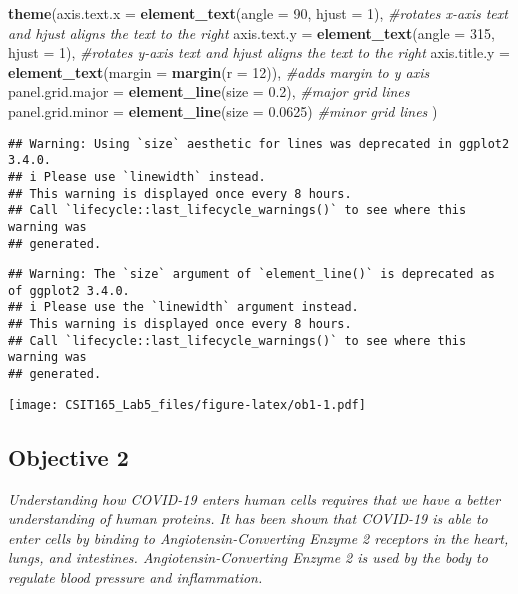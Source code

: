 \documentclass[
]{article}
\newenvironment{Shaded}{\begin{snugshade}}{\end{snugshade}}
\newcommand{\AttributeTok}[1]{\textcolor[rgb]{0.13,0.29,0.53}{#1}}
\newcommand{\CommentTok}[1]{\textcolor[rgb]{0.56,0.35,0.01}{\textit{#1}}}
\newcommand{\DecValTok}[1]{\textcolor[rgb]{0.00,0.00,0.81}{#1}}
\newcommand{\FloatTok}[1]{\textcolor[rgb]{0.00,0.00,0.81}{#1}}
\newcommand{\FunctionTok}[1]{\textcolor[rgb]{0.13,0.29,0.53}{\textbf{#1}}}
\newcommand{\NormalTok}[1]{#1}
\begin{document}
\begin{Shaded}
\begin{Highlighting}[]
  \FunctionTok{theme}\NormalTok{(}\AttributeTok{axis.text.x =} \FunctionTok{element\_text}\NormalTok{(}\AttributeTok{angle =} \DecValTok{90}\NormalTok{, }\AttributeTok{hjust =} \DecValTok{1}\NormalTok{), }\CommentTok{\#rotates x{-}axis text and hjust aligns the text to the right}
        \AttributeTok{axis.text.y =} \FunctionTok{element\_text}\NormalTok{(}\AttributeTok{angle =} \DecValTok{315}\NormalTok{, }\AttributeTok{hjust =} \DecValTok{1}\NormalTok{), }\CommentTok{\#rotates y{-}axis text and hjust aligns the text to the right}
        \AttributeTok{axis.title.y =} \FunctionTok{element\_text}\NormalTok{(}\AttributeTok{margin =} \FunctionTok{margin}\NormalTok{(}\AttributeTok{r =} \DecValTok{12}\NormalTok{)), }\CommentTok{\#adds margin to y axis}
        \AttributeTok{panel.grid.major =} \FunctionTok{element\_line}\NormalTok{(}\AttributeTok{size =} \FloatTok{0.2}\NormalTok{), }\CommentTok{\#major grid lines}
        \AttributeTok{panel.grid.minor =} \FunctionTok{element\_line}\NormalTok{(}\AttributeTok{size =} \FloatTok{0.0625}\NormalTok{) }\CommentTok{\#minor grid lines}
\NormalTok{       )}
\end{Highlighting}
\end{Shaded}

\begin{verbatim}
## Warning: Using `size` aesthetic for lines was deprecated in ggplot2 3.4.0.
## i Please use `linewidth` instead.
## This warning is displayed once every 8 hours.
## Call `lifecycle::last_lifecycle_warnings()` to see where this warning was
## generated.
\end{verbatim}

\begin{verbatim}
## Warning: The `size` argument of `element_line()` is deprecated as of ggplot2 3.4.0.
## i Please use the `linewidth` argument instead.
## This warning is displayed once every 8 hours.
## Call `lifecycle::last_lifecycle_warnings()` to see where this warning was
## generated.
\end{verbatim}

\texttt{[image: CSIT165\_Lab5\_files/figure-latex/ob1-1.pdf]}

\subsection{Objective 2}\label{objective-2}

\emph{Understanding how COVID-19 enters human cells requires that we
have a better understanding of human proteins. It has been shown that
COVID-19 is able to enter cells by binding to Angiotensin-Converting
Enzyme 2 receptors in the heart, lungs, and intestines.
Angiotensin-Converting Enzyme 2 is used by the body to regulate blood
pressure and inflammation.}
\end{document}
